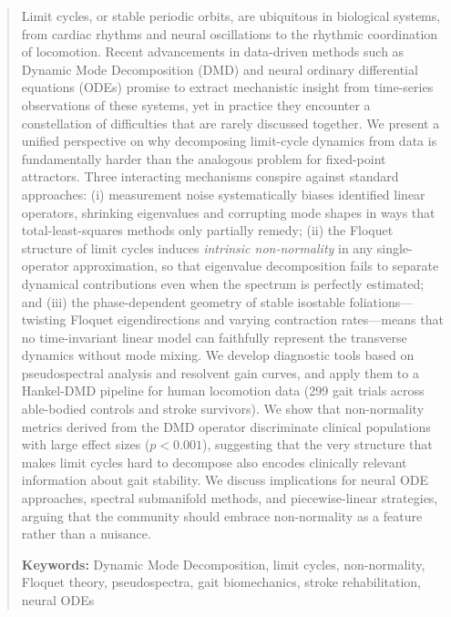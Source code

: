 \documentclass[12pt]{article}
\begin{document}
\begin{abstract}
Limit cycles, or stable periodic orbits, are ubiquitous in biological systems,
from cardiac rhythms and neural oscillations to the rhythmic coordination of
locomotion. Recent advancements in data-driven methods such as Dynamic Mode Decomposition (DMD) and
neural ordinary differential equations (ODEs) promise to extract mechanistic
insight from time-series observations of these systems, yet in practice they
encounter a constellation of difficulties that are rarely discussed together.
We present a unified perspective on why decomposing limit-cycle dynamics from
data is fundamentally harder than the analogous problem for fixed-point
attractors. Three interacting mechanisms conspire against standard approaches:
(i) measurement noise systematically biases identified linear operators,
shrinking eigenvalues and corrupting mode shapes in ways that total-least-squares
methods only partially remedy; (ii) the Floquet structure of limit cycles
induces \emph{intrinsic non-normality} in any single-operator approximation,
so that eigenvalue decomposition fails to separate dynamical contributions even
when the spectrum is perfectly estimated; and (iii) the phase-dependent geometry
of stable isostable foliations---twisting Floquet eigendirections and varying
contraction rates---means that no time-invariant linear model can faithfully
represent the transverse dynamics without mode mixing. We develop diagnostic
tools based on pseudospectral analysis and resolvent gain curves, and apply
them to a Hankel-DMD pipeline for human locomotion data (299 gait trials
across able-bodied controls and stroke survivors). We show that non-normality
metrics derived from the DMD operator discriminate clinical populations with
large effect sizes ($p < 0.001$), suggesting that the very structure that
makes limit cycles hard to decompose also encodes clinically relevant
information about gait stability. We discuss implications for neural ODE
approaches, spectral submanifold methods, and piecewise-linear strategies,
arguing that the community should embrace non-normality as a feature rather
than a nuisance.

\vspace{6pt}
\noindent\textbf{Keywords:}
Dynamic Mode Decomposition, limit cycles, non-normality, Floquet theory,
pseudospectra, gait biomechanics, stroke rehabilitation, neural ODEs
\end{abstract}
\end{document}

